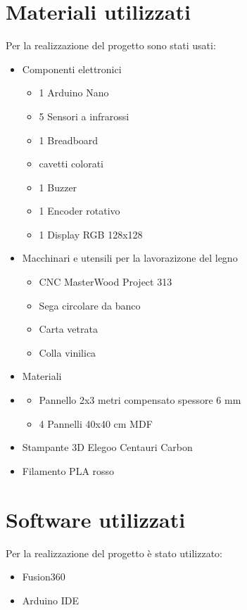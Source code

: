 \documentclass{article}
\begin{document}
\section{Materiali utilizzati}
Per la realizzazione del progetto sono stati usati:
\begin{itemize}
    \item Componenti elettronici
    \begin{itemize}
        \item 1 Arduino Nano
        \item 5 Sensori a infrarossi
        \item 1 Breadboard
        \item cavetti colorati
        \item 1 Buzzer
        \item 1 Encoder rotativo
        \item 1 Display RGB 128x128
    \end{itemize}
    \item Macchinari e utensili per la lavorazizone del legno
    \begin{itemize}
        \item CNC MasterWood Project 313
        \item Sega circolare da banco
        \item Carta vetrata
        \item Colla vinilica
    \end{itemize}
    \item Materiali
    \item \begin{itemize}
        \item Pannello 2x3 metri compensato spessore 6 mm
        \item 4 Pannelli 40x40 cm MDF
    \end{itemize}
    \item Stampante 3D Elegoo Centauri Carbon
    \item Filamento PLA rosso
\end{itemize}

\section{Software utilizzati}
Per la realizzazione del progetto è stato utilizzato:
\begin{itemize}
    \item Fusion360
    \item Arduino IDE
\end{itemize}
\end{document}
